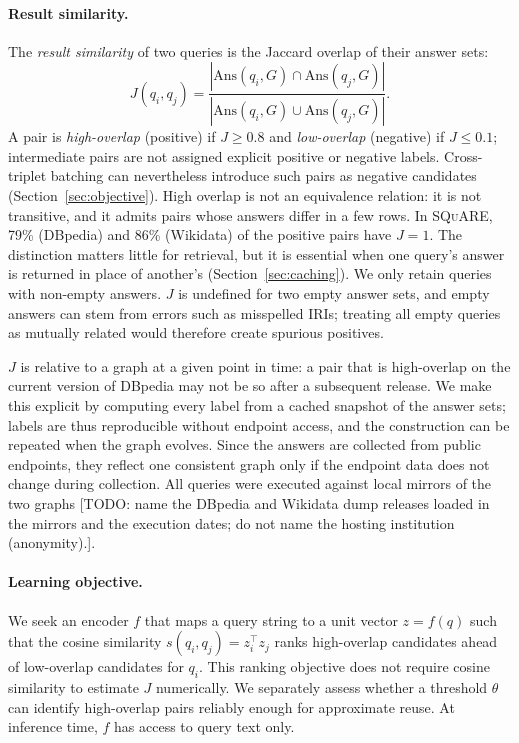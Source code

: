 \documentclass[runningheads]{llncs}
\newcommand{\squareds}{\textsc{SQuARE}}
\newcommand{\Ans}{\mathrm{Ans}}
\newcommand{\hp}[1]{{\color{red!75!black}#1}}
\begin{document}
\paragraph{Result similarity.}
The \emph{result similarity} of two queries is the Jaccard overlap of their
answer sets:
\begin{equation}
J(q_i,q_j) = \frac{|\Ans(q_i,G) \cap \Ans(q_j,G)|}{|\Ans(q_i,G) \cup \Ans(q_j,G)|}.
\label{eq:jaccard}
\end{equation}
A pair is \emph{high-overlap} (positive) if $J \geq 0.8$ and
\emph{low-overlap} (negative) if $J \leq 0.1$; intermediate pairs are not
assigned explicit positive or negative labels. Cross-triplet batching can
nevertheless introduce such pairs as negative candidates
(Section~\ref{sec:objective}). High overlap is not an equivalence relation: it is not
transitive, and it admits pairs whose answers differ in a few rows. In \squareds{},
79\% (DBpedia) and 86\% (Wikidata) of the positive pairs have $J = 1$. The distinction matters
little for retrieval, but it is essential when one query's answer is returned
in place of another's (Section~\ref{sec:caching}).
We only retain queries with non-empty answers. $J$ is undefined for two empty
answer sets, and empty answers can stem from errors such as misspelled IRIs;
treating all empty queries as mutually related would therefore create
spurious positives.

$J$ is relative to a graph at a given point in time: a pair that is
high-overlap on the current version of DBpedia may not be so after a
subsequent release. We make this explicit by computing every label from a
cached snapshot of the answer sets; labels are thus reproducible without
endpoint access, and the construction can be repeated when the graph evolves.
Since the answers are collected from public endpoints, they reflect one
consistent graph only if the endpoint data does not change during collection.
All queries were executed against local mirrors of the two graphs
\hp{[TODO: name the DBpedia and Wikidata dump releases loaded in the mirrors
and the execution dates; do not name the hosting institution (anonymity).]}.

\paragraph{Learning objective.}
We seek an encoder $f$ that maps a query string to a unit vector $z = f(q)$
such that the cosine similarity $s(q_i,q_j) = z_i^{\top} z_j$ ranks high-overlap
candidates ahead of low-overlap candidates for $q_i$. This ranking objective
does not require cosine similarity to estimate $J$ numerically. We separately
assess whether a threshold $\theta$ can identify high-overlap pairs reliably
enough for approximate reuse. At inference time, $f$ has access to query
text only.
\end{document}
